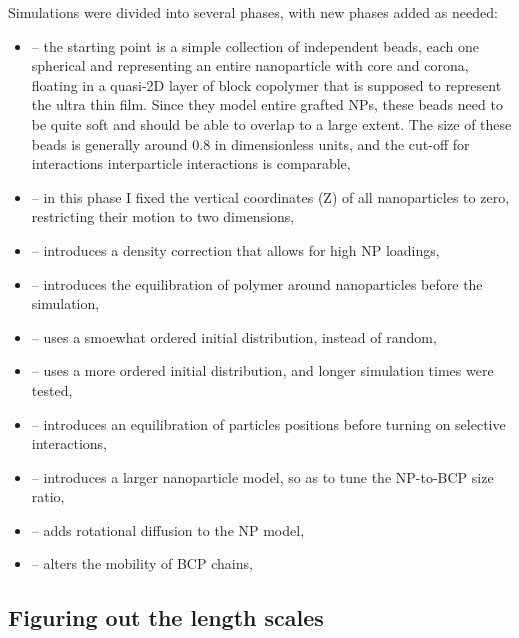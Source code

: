 Simulations were divided into several phases, with new phases added as needed:
\begin{itemize}
\setlength{\itemsep}{-2pt}
\item[]  -- the starting point is a simple collection of independent beads, each one spherical and representing an entire nanoparticle with core and corona, floating in a quasi-2D layer of block copolymer that is supposed to represent the ultra thin film. Since they model entire grafted NPs, these beads need to be quite soft and should be able to overlap to a large extent. The size of these beads is generally around 0.8 in dimensionless units, and the cut-off for interactions interparticle interactions is comparable,
\item[]  -- in this phase I fixed the vertical coordinates (Z) of all nanoparticles to zero, restricting their motion to two dimensions,
\item[]  -- introduces a density correction that allows for high NP loadings,
\item[]  -- introduces the equilibration of polymer around nanoparticles before the simulation,
\item[]  -- uses a smoewhat ordered initial distribution, instead of random,
\item[]  -- uses a more ordered initial distribution, and longer simulation times were tested,
\item[]  -- introduces an equilibration of particles positions before turning on selective interactions,
\item[]  -- introduces a larger nanoparticle model, so as to tune the NP-to-BCP size ratio,
\item[]  -- adds rotational diffusion to the NP model,
\item[]  -- alters the mobility of BCP chains,
\end{itemize}

\subsection{Figuring out the length scales}

